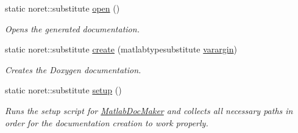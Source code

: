 \begin{DoxyCompactItemize}
static noret\+::substitute \hyperlink{class_matlab_doc_maker_ac0a03050ca09039ccd6a1fc97367a38b}{open} ()
\begin{DoxyCompactList}\small\item\em Opens the generated documentation. \end{DoxyCompactList}\item 
static noret\+::substitute \hyperlink{class_matlab_doc_maker_a278883e6b83f6c6e7780e0d567dee119}{create} (matlabtypesubstitute \hyperlink{classvarargin}{varargin})
\begin{DoxyCompactList}\small\item\em Creates the Doxygen documentation. \end{DoxyCompactList}\item 
\hypertarget{class_matlab_doc_maker_a434c176c2421dd18a40003919b19f4f2}{}static noret\+::substitute \hyperlink{class_matlab_doc_maker_a434c176c2421dd18a40003919b19f4f2}{setup} ()\label{class_matlab_doc_maker_a434c176c2421dd18a40003919b19f4f2}

\begin{DoxyCompactList}\small\item\em Runs the setup script for \hyperlink{class_matlab_doc_maker}{Matlab\+Doc\+Maker} and collects all necessary paths in order for the documentation creation to work properly. \end{DoxyCompactList}\end{DoxyCompactItemize}
